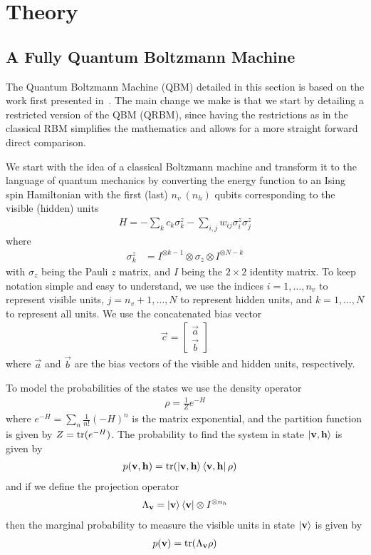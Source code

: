 \section{Theory}
\subsection{A Fully Quantum Boltzmann Machine}
The Quantum Boltzmann Machine (QBM) detailed in this section is based on the work first presented in~\cite{amin_2018}.
The main change we make is that we start by detailing a restricted version of the QBM (QRBM), since having the restrictions as in the classical RBM simplifies the mathematics and allows for a more straight forward direct comparison.

We start with the idea of a classical Boltzmann machine and transform it to the language of quantum mechanics by converting the energy function to an Ising spin Hamiltonian with the first (last) \( n_v \ (n_h) \) qubits corresponding to the visible (hidden) units
\begin{align}
    H = -\sum_k c_k \sigma_k^z - \sum_{i,j} w_{ij} \sigma_i^z \sigma_j^z
\end{align}
where
\begin{align}
    \sigma_k^z
        &= I^{\otimes k-1} \otimes \sigma_z \otimes I^{\otimes N-k}
\end{align}
with \( \sigma_z \) being the Pauli \( z \) matrix, and \( I \) being the \( 2 \times 2 \) identity matrix.
To keep notation simple and easy to understand, we use the indices \( i = 1, \dots, n_v \) to represent visible units, \( j = n_v + 1, \dots, N \) to represent hidden units, and \( k = 1, \dots, N \) to represent all units.
We use the concatenated bias vector
\begin{align}
    \vec{c} = \begin{bmatrix}
        \vec{a} \\
        \vec{b}
    \end{bmatrix}
\end{align}
where \( \vec{a} \) and \( \vec{b} \) are the bias vectors of the visible and hidden units, respectively.

To model the probabilities of the states we use the density operator
\begin{align}
    \rho = \frac{1}{Z} e^{-H}
\end{align}
where \( e^{-H} = \sum_n \frac{1}{n!} (-H)^n \) is the matrix exponential, and the partition function is given by \( Z = \text{tr}(e^{-H}) \).
The probability to find the system in state \( \ket{\mathbf{v},\mathbf{h}} \) is given by
\begin{align}
    p(\mathbf{v},\mathbf{h})
        &= \text{tr}(\ket{\mathbf{v},\mathbf{h}}\bra{\mathbf{v},\mathbf{h}} \rho)
\end{align}
and if we define the projection operator
\begin{align}
    \Lambda_{\mathbf{v}} = \ket{\mathbf{v}}\bra{\mathbf{v}} \otimes I^{\otimes n_h}
\end{align}
then the marginal probability to measure the visible units in state \( \ket{\mathbf{v}} \) is given by
\begin{align}
    p(\mathbf{v}) = \text{tr}(\Lambda_{\mathbf{v}}\rho)
\end{align}

